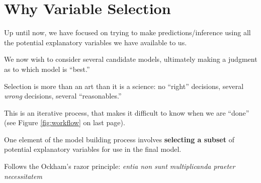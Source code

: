 \documentclass[12pt]{notes}
\begin{document}

\section{Why Variable Selection}
\bi
\item Up until now, we have focused on trying to make predictions/inference using all the potential explanatory variables we have available to us. 
\item We now wish to consider several candidate models, ultimately making a judgment as to which model is ``best.''
\bi
\item Selection is more than an art than it is a science: no ``right'' decisions, several \textit{wrong} decisions, several ``reasonables.''
\item This is an iterative process, that makes it difficult to know when we are ``done'' (see Figure \ref{fig:workflow} on last page). 
\ei
\item One element of the model building process involves \textbf{selecting a subset} of potential explanatory variables for use in the final model. 
\bi
\item Follows the Ockham's razor principle:  \emph{entia non sunt multiplicanda praeter necessitatem}
\ei
\begin{minipage}[l][2cm][c]{\textwidth}
\end{minipage}
\ei




\begin{minipage}[l][4cm][c]{\textwidth}
\end{minipage}

\end{document}
